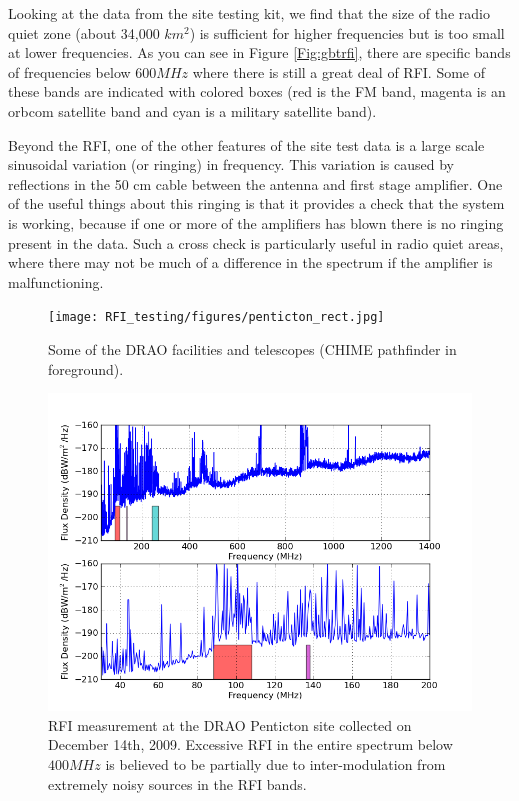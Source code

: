 Looking at the data from the site testing kit, we find that the size of the radio quiet zone (about 34,000 $km^2$) is sufficient for higher frequencies but is too small at lower frequencies. As you can see in Figure \ref{Fig:gbtrfi}, there are specific bands of frequencies below $600 MHz$ where there is still a great deal of RFI. Some of these bands are indicated with colored boxes (red is the FM band, magenta is an orbcom satellite band and cyan is a military satellite band). 

Beyond the RFI, one of the other features of the site test data is a large scale sinusoidal variation (or ringing) in frequency. This variation is caused by reflections in the 50 cm cable between the antenna and first stage amplifier. One of the useful things about this ringing is that it provides a check that the system is working, because if one or more of the amplifiers has blown there is no ringing present in the data. Such a cross check is particularly useful in radio quiet areas, where there may not be much of a difference in the spectrum if the amplifier is malfunctioning. 

\begin{figure}[htb]
\begin{center}
\texttt{[image: RFI\_testing/figures/penticton\_rect.jpg]}
\caption{Some of the DRAO facilities and telescopes (CHIME pathfinder in foreground). }
\label{Fig:penticton}
\end{center}
\end{figure}

\begin{figure}[htb]
\begin{center}
\includegraphics[width=0.9\linewidth]{RFI_testing/figures/DRAO_bands.png}
\caption{RFI measurement at the DRAO Penticton site collected on December 14th, 2009. Excessive RFI in the entire spectrum below $400 MHz$ is believed to be partially due to inter-modulation from extremely noisy sources in the RFI bands. }
\label{Fig:draorfi}
\end{center}
\end{figure}


